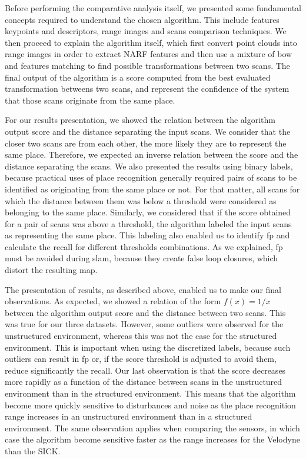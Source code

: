Before performing the comparative analysis itself, we presented some fundamental concepts required to understand the chosen algorithm. This include features keypoints and descriptors, range images and scans comparison techniques. We then proceed to explain the algorithm itself, which first convert point clouds into range images in order to extract NARF features and then use a mixture of \gls*{bow} and features matching to find possible transformations between two scans. The final output of the algorithm is a score computed from the best evaluated transformation betweens two scans, and represent the confidence of the system that those scans originate from the same place. 

For our results presentation, we showed the relation between the algorithm output score and the distance separating the input scans. We consider that the closer two scans are from each other, the more likely they are to represent the same place. Therefore, we expected an inverse relation between the score and the distance separating the scans. We also presented the results using binary labels, because practical uses of place recognition generally required pairs of scans to be identified as originating from the same place or not. For that matter, all scans for which the distance between them was below a threshold were considered as belonging to the same place. Similarly, we considered that if the score obtained for a pair of scans was above a threshold, the algorithm labeled the input scans as representing the same place. This labeling also enabled us to identify \gls*{fp} and calculate the recall for different thresholds combinations. As we explained, \gls*{fp} must be avoided during \gls*{slam}, because they create false loop closures, which distort the resulting map. 

The presentation of results, as described above, enabled us to make our final observations. As expected, we showed a relation of the form $f(x)=1/x$ between the algorithm output score and the distance between two scans. This was true for our three datasets. However, some outliers were observed for the unstructured environment, whereas this was not the case for the structured environment. This is important when using the discretized labels, because such outliers can result in \gls*{fp} or, if the score threshold is adjusted to avoid them, reduce significantly the recall. Our last observation is that the score decreases more rapidly as a function of the distance between scans in the unstructured environment than in the structured environment. This means that the algorithm become more quickly sensitive to disturbances and noise as the place recognition range increases in an unstructured environment than in a structured environment. The same observation applies when comparing the sensors, in which case the algorithm become sensitive faster as the range increases for the Velodyne than the SICK.


